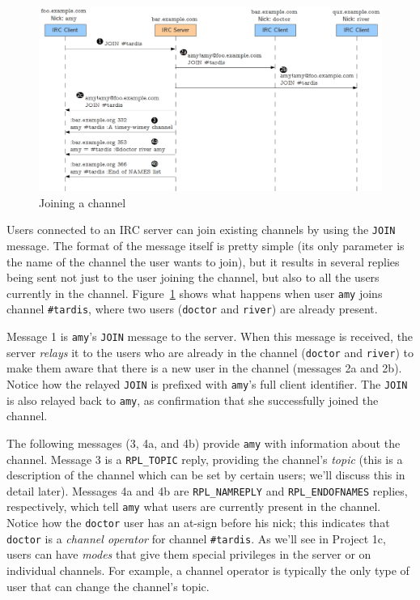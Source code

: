 \documentclass[10pt]{article}
\begin{document}
\begin{figure}
\begin{center}
\includegraphics[width=1\textwidth]{channel_join.png}
\caption{Joining a channel}
\label{fig:channel_join}
\end{center}
\end{figure}

Users connected to an IRC server can join existing channels by using the \texttt{JOIN} message. The format of the message itself is pretty simple (its only parameter is the name of the channel the user wants to join), but it results in several replies being sent not just to the user joining the channel, but also to all the users currently in the channel. Figure~\ref{fig:channel_join} shows what happens when user \texttt{amy} joins channel \texttt{\#tardis}, where two users (\texttt{doctor} and \texttt{river}) are already present.

Message 1 is \texttt{amy}'s \texttt{JOIN} message to the server. When this message is received, the server \emph{relays} it to the users who are already in the channel (\texttt{doctor} and \texttt{river}) to make them aware that there is a new user in the channel (messages 2a and 2b). Notice how the relayed \texttt{JOIN} is prefixed with \texttt{amy}'s full client identifier. The \texttt{JOIN} is also relayed back to \texttt{amy}, as confirmation that she successfully joined the channel.

The following messages (3, 4a, and 4b) provide \texttt{amy} with information about the channel. Message 3 is a \texttt{RPL\_TOPIC} reply, providing the channel's \emph{topic} (this is a description of the channel which can be set by certain users; we'll discuss this in detail later). Messages 4a and 4b are \texttt{RPL\_NAMREPLY} and \texttt{RPL\_ENDOFNAMES} replies, respectively, which tell \texttt{amy} what users are currently present in the channel. Notice how the \texttt{doctor} user has an at-sign before his nick; this indicates that \texttt{doctor} is a \emph{channel operator} for channel \texttt{\#tardis}. As we'll see in Project 1c, users can have \emph{modes} that give them special privileges in the server or on individual channels. For example, a channel operator is typically the only type of user that can change the channel's topic.
\end{document}
